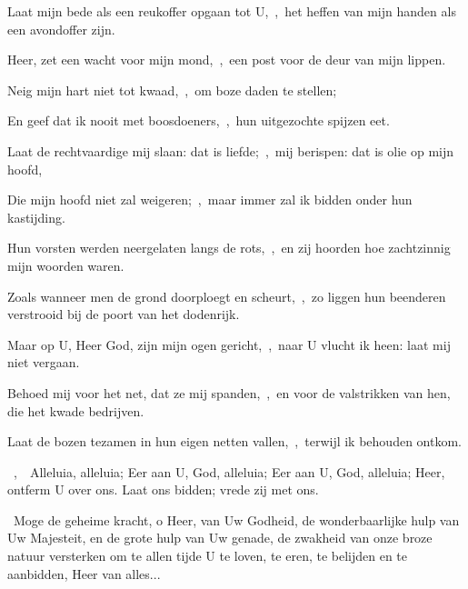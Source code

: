 \documentclass[12pt,twoside,a5paper]{article}
\begin{document}
\begin{halfparskip}
  Laat mijn bede als een reukoffer opgaan tot U,~\sep\ het heffen van mijn handen als een avondoffer zijn.

  Heer, zet een wacht voor mijn mond,~\sep\ een post voor de deur van mijn lippen.

  Neig mijn hart niet tot kwaad,~\sep\ om boze daden te stellen;

  En geef dat ik nooit met boosdoeners,~\sep\ hun uitgezochte spijzen eet.

  Laat de rechtvaardige mij slaan: dat is liefde;~\sep\ mij berispen: dat is olie op mijn hoofd,

  Die mijn hoofd niet zal weigeren;~\sep\ maar immer zal ik bidden onder hun kastijding.

  Hun vorsten werden neergelaten langs de rots,~\sep\ en zij hoorden hoe zachtzinnig mijn woorden waren.

  Zoals wanneer men de grond doorploegt en scheurt,~\sep\ zo liggen hun beenderen verstrooid bij de poort van het dodenrijk.

  Maar op U, Heer God, zijn mijn ogen gericht,~\sep\ naar U vlucht ik heen: laat mij niet vergaan.

  Behoed mij voor het net, dat ze mij spanden,~\sep\ en voor de valstrikken van hen, die het kwade bedrijven.

  Laat de bozen tezamen in hun eigen netten vallen,~\sep\ terwijl ik behouden ontkom.
\end{halfparskip}

\begin{halfparskip}
  ~\sep\ \dd~Alleluia, alleluia; Eer aan U, God, alleluia; Eer aan U, God, alleluia; Heer, ontferm U over ons. Laat ons bidden; vrede zij met ons.

  \cc~Moge de geheime kracht, o Heer, van Uw Godheid, de wonderbaarlijke hulp van Uw Majesteit, en de grote hulp van Uw genade, de zwakheid van onze broze natuur versterken om te allen tijde U te loven, te eren, te belijden en te aanbidden, Heer van alles...
\end{halfparskip}

\end{document}
